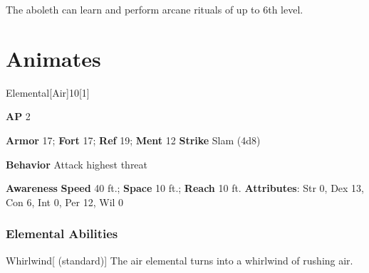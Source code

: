 The aboleth can learn and perform arcane rituals of up to 6th level.

\section{Animates}
\begin{monsection}{Elemental}[Air]{10}[1]
\vspace{-1em}\vspace{-1em}
\begin{spellcontent}
\begin{spelltargetinginfo}
{\textbf{AP} 2}

\pari \textbf{Armor} 17;
\textbf{Fort} 17;
\textbf{Ref} 19;
\textbf{Ment} 12
\pari \textbf{Strike} Slam  (4d8)



\pari \textbf{Behavior} Attack highest threat
\end{spelltargetinginfo}
\end{spellcontent}

\begin{monsterfooter}
\pari \textbf{Awareness} 
\pari \textbf{Speed} 40 ft.;
\textbf{Space} 10 ft.;
\textbf{Reach} 10 ft.
\pari \textbf{Attributes}:
Str 0,
Dex 13,
Con 6,
Int 0,
Per 12,
Wil 0
\end{monsterfooter}
\end{monsection}


\subsubsection{Elemental Abilities}

\begin{ability}{Whirlwind}[ (standard)]
The air elemental turns into a whirlwind of rushing air.
\end{ability}

